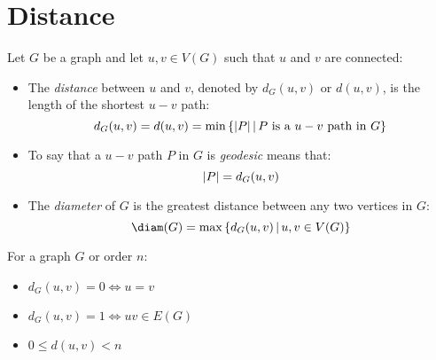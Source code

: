 \documentclass[letterpaper,12pt,fleqn]{article}
\begin{document}
\section*{Distance}

\begin{definition}[Distance]
  Let \(G\) be a graph and let \(u,v\in V(G)\) such that \(u\) and \(v\) are connected:
  \begin{itemize}
  \item The \emph{distance} between \(u\) and \(v\), denoted by \(d_G(u,v)\) or \(d(u,v)\), is the length of the
    shortest \(u-v\) path:
    \[d_G(u,v)=d(u,v)=\min\setb{\abs{P}}{P\ \text{is a}\ u-v\ \text{path in}\ G}\]
  \item To say that a \(u-v\) path \(P\) in \(G\) is \emph{geodesic} means that:
    \[\lvert P\rvert=d_G(u,v)\]
  \item The \emph{diameter} of \(G\) is the greatest distance between any two vertices in \(G\):
    \[\diam(G)=\max\setb{d_G(u,v)}{u,v\in V(G)}\]
  \end{itemize}
\end{definition}

For a graph \(G\) or order \(n\):
\begin{itemize}
\item \(d_G(u,v)=0 \iff u=v\)
\item \(d_G(u,v)=1 \iff uv\in E(G)\)
\item \(0\le d(u,v)<n\)
\end{itemize}
\end{document}
